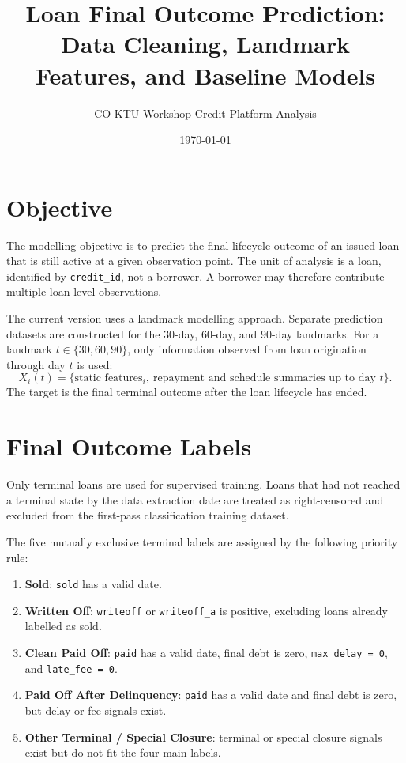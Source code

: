 \documentclass[11pt]{article}
\title{Loan Final Outcome Prediction: Data Cleaning, Landmark Features, and Baseline Models}
\author{CO-KTU Workshop Credit Platform Analysis}
\date{\today}
\begin{document}
\maketitle

\section{Objective}

The modelling objective is to predict the final lifecycle outcome of an issued loan that is still active at a given observation point. The unit of analysis is a loan, identified by \texttt{credit\_id}, not a borrower. A borrower may therefore contribute multiple loan-level observations.

The current version uses a landmark modelling approach. Separate prediction datasets are constructed for the 30-day, 60-day, and 90-day landmarks. For a landmark \(t \in \{30,60,90\}\), only information observed from loan origination through day \(t\) is used:
\[
X_i(t) = \{\text{static features}_i,\ \text{repayment and schedule summaries up to day } t\}.
\]
The target is the final terminal outcome after the loan lifecycle has ended.

\section{Final Outcome Labels}

Only terminal loans are used for supervised training. Loans that had not reached a terminal state by the data extraction date are treated as right-censored and excluded from the first-pass classification training dataset.

The five mutually exclusive terminal labels are assigned by the following priority rule:

\begin{enumerate}
    \item \textbf{Sold}: \texttt{sold} has a valid date.
    \item \textbf{Written Off}: \texttt{writeoff} or \texttt{writeoff\_a} is positive, excluding loans already labelled as sold.
    \item \textbf{Clean Paid Off}: \texttt{paid} has a valid date, final debt is zero, \texttt{max\_delay = 0}, and \texttt{late\_fee = 0}.
    \item \textbf{Paid Off After Delinquency}: \texttt{paid} has a valid date and final debt is zero, but delay or fee signals exist.
    \item \textbf{Other Terminal / Special Closure}: terminal or special closure signals exist but do not fit the four main labels.
\end{enumerate}
\end{document}
